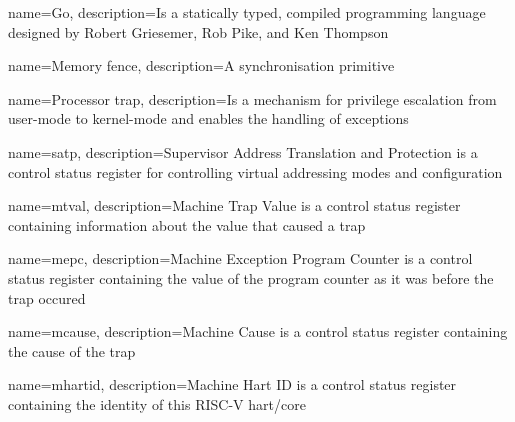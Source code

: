 
 {
    name=Go,
    description={Is a statically typed, compiled programming language designed by Robert Griesemer, Rob Pike, and Ken Thompson}
}

 {
    name=Memory fence,
    description={A synchronisation primitive}
}

 {
    name=Processor trap,
    description={Is a mechanism for privilege escalation from user-mode to kernel-mode and enables the handling of exceptions}
}

 {
    name=satp,
    description={Supervisor Address Translation and Protection is a control status register for controlling virtual addressing modes and configuration}
}

 {
    name=mtval,
    description={Machine Trap Value is a control status register containing information about the value that caused a trap}
}

 {
    name=mepc,
    description={Machine Exception Program Counter is a control status register containing the value of the program counter as it was before the trap occured}
}

 {
    name=mcause,
    description={Machine Cause is a control status register containing the cause of the trap}
}

 {
    name=mhartid,
    description={Machine Hart ID is a control status register containing the identity of this RISC-V hart/core}
}
